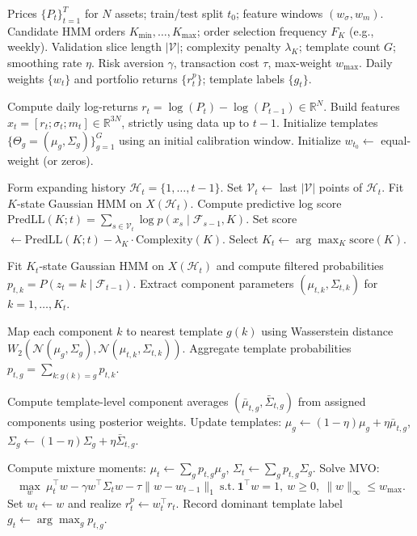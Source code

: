 \documentclass[11pt]{article}
\begin{document}
\begin{algorithm}[H]
\caption{Parametric Regime Investing}
\label{alg:parametric_templates}
\begin{algorithmic}[1]
\Require Prices $\{P_t\}_{t=1}^T$ for $N$ assets; train/test split $t_0$; feature windows $(w_\sigma,w_m)$.
\Require Candidate HMM orders $K_{\min},\dots,K_{\max}$; order selection frequency $F_K$ (e.g., weekly).
\Require Validation slice length $|\mathcal{V}|$; complexity penalty $\lambda_K$; template count $G$; smoothing rate $\eta$.
\Require Risk aversion $\gamma$, transaction cost $\tau$, max-weight $w_{\max}$.
\Ensure Daily weights $\{w_t\}$ and portfolio returns $\{r_t^p\}$; template labels $\{g_t\}$.

\State Compute daily log-returns $r_t=\log(P_t)-\log(P_{t-1})\in\mathbb{R}^N$.
\State Build features $x_t=[r_t;\sigma_t;m_t]\in\mathbb{R}^{3N}$, strictly using data up to $t-1$.
\State Initialize templates $\{\Theta_g=(\mu_g,\Sigma_g)\}_{g=1}^G$ using an initial calibration window.
\State Initialize $w_{t_0}\leftarrow$ equal-weight (or zeros).

    \State Form expanding history $\mathcal{H}_t=\{1,\dots,t-1\}$.
        \State Set $\mathcal{V}_t \leftarrow$ last $|\mathcal{V}|$ points of $\mathcal{H}_t$.
            \State Fit $K$-state Gaussian HMM on $X(\mathcal{H}_t)$.
            \State Compute predictive log score $\text{PredLL}(K;t)=\sum_{s\in\mathcal{V}_t}\log p(x_s\mid\mathcal{F}_{s-1},K)$.
            \State Set score $\leftarrow \text{PredLL}(K;t)-\lambda_K\cdot \text{Complexity}(K)$.
        \EndFor
        \State Select $K_t \leftarrow \arg\max_K \text{score}(K)$.
    \EndIf

    \State Fit $K_t$-state Gaussian HMM on $X(\mathcal{H}_t)$ and compute filtered probabilities $p_{t,k}=P(z_t=k\mid\mathcal{F}_{t-1})$.
    \State Extract component parameters $(\mu_{t,k},\Sigma_{t,k})$ for $k=1,\dots,K_t$.

    \State Map each component $k$ to nearest template $g(k)$ using Wasserstein distance $W_2(\mathcal{N}(\mu_g,\Sigma_g),\mathcal{N}(\mu_{t,k},\Sigma_{t,k}))$.
    \State Aggregate template probabilities $p_{t,g}=\sum_{k:g(k)=g}p_{t,k}$.

    \State Compute template-level component averages $(\bar\mu_{t,g},\bar\Sigma_{t,g})$ from assigned components using posterior weights.
    \State Update templates: $\mu_g\leftarrow(1-\eta)\mu_g+\eta\bar\mu_{t,g}$, $\Sigma_g\leftarrow(1-\eta)\Sigma_g+\eta\bar\Sigma_{t,g}$.

    \State Compute mixture moments: $\mu_t\leftarrow\sum_g p_{t,g}\mu_g$, $\Sigma_t\leftarrow\sum_g p_{t,g}\Sigma_g$.
    \State Solve MVO:
    \[
    \max_{w}\ \mu_t^\top w-\gamma w^\top\Sigma_t w-\tau\|w-w_{t-1}\|_1
    \ \text{s.t.}\ \mathbf{1}^\top w=1,\ w\ge0,\ \|w\|_\infty\le w_{\max}.
    \]
    \State Set $w_t\leftarrow w$ and realize $r_t^p\leftarrow w_t^\top r_t$.
    \State Record dominant template label $g_t\leftarrow \arg\max_g p_{t,g}$.
\EndFor

\end{algorithmic}
\end{algorithm}
\end{document}
